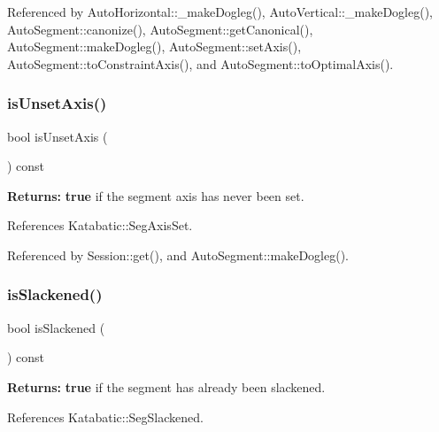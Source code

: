 Referenced by Auto\+Horizontal\+::\+\_\+make\+Dogleg(), Auto\+Vertical\+::\+\_\+make\+Dogleg(), Auto\+Segment\+::canonize(), Auto\+Segment\+::get\+Canonical(), Auto\+Segment\+::make\+Dogleg(), Auto\+Segment\+::set\+Axis(), Auto\+Segment\+::to\+Constraint\+Axis(), and Auto\+Segment\+::to\+Optimal\+Axis().

\mbox{\label{classKatabatic_1_1AutoSegment_a2bd22f431b7cf3695babab78fc3b4c9e}} 
\subsubsection{\texorpdfstring{is\+Unset\+Axis()}{isUnsetAxis()}}
{\footnotesize\ttfamily bool is\+Unset\+Axis (\begin{DoxyParamCaption}{ }\end{DoxyParamCaption}) const\hspace{0.3cm}{\ttfamily [inline]}}

{\bfseries Returns\+:} {\bfseries true} if the segment axis has never been set. 

References Katabatic\+::\+Seg\+Axis\+Set.



Referenced by Session\+::get(), and Auto\+Segment\+::make\+Dogleg().

\mbox{\label{classKatabatic_1_1AutoSegment_a782cff57d3fe10e758d19ee65a06643d}} 
\subsubsection{\texorpdfstring{is\+Slackened()}{isSlackened()}}
{\footnotesize\ttfamily bool is\+Slackened (\begin{DoxyParamCaption}{ }\end{DoxyParamCaption}) const\hspace{0.3cm}{\ttfamily [inline]}}

{\bfseries Returns\+:} {\bfseries true} if the segment has already been slackened. 

References Katabatic\+::\+Seg\+Slackened.




